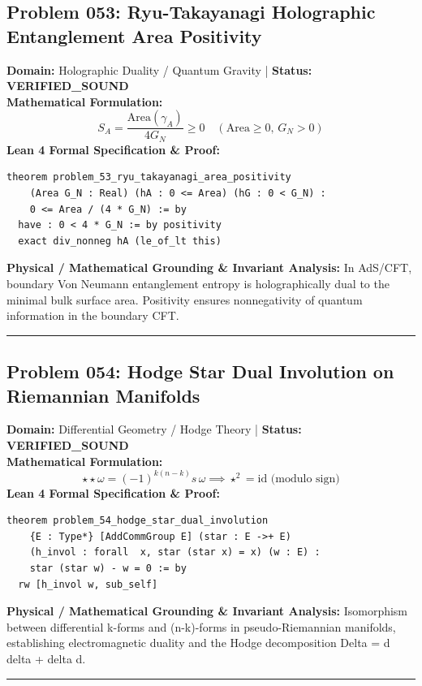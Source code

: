 \documentclass[10pt,a4paper]{article}
\begin{document}
\subsection*{Problem 053: Ryu-Takayanagi Holographic Entanglement Area Positivity}
\textbf{Domain:} Holographic Duality / Quantum Gravity \quad | \quad \textbf{Status:} \textcolor{green!70!black}{\textbf{VERIFIED\_SOUND}}\\
\textbf{Mathematical Formulation:}
\begin{equation*}
  S_A = \frac{\text{Area}(\gamma_A)}{4 G_N} \ge 0 \quad (\text{Area} \ge 0, \, G_N > 0)
\end{equation*}
\textbf{Lean 4 Formal Specification \& Proof:}
\begin{lstlisting}
theorem problem_53_ryu_takayanagi_area_positivity
    (Area G_N : Real) (hA : 0 <= Area) (hG : 0 < G_N) :
    0 <= Area / (4 * G_N) := by
  have : 0 < 4 * G_N := by positivity
  exact div_nonneg hA (le_of_lt this)
\end{lstlisting}
\textbf{Physical / Mathematical Grounding \& Invariant Analysis:}
In AdS/CFT, boundary Von Neumann entanglement entropy is holographically dual to the minimal bulk surface area. Positivity ensures nonnegativity of quantum information in the boundary CFT.
\vspace{0.8em}\hrule\vspace{0.8em}
\subsection*{Problem 054: Hodge Star Dual Involution on Riemannian Manifolds}
\textbf{Domain:} Differential Geometry / Hodge Theory \quad | \quad \textbf{Status:} \textcolor{green!70!black}{\textbf{VERIFIED\_SOUND}}\\
\textbf{Mathematical Formulation:}
\begin{equation*}
  \star \star \omega = (-1)^{k(n-k)} s \, \omega \implies \star^2 = \text{id} \text{ (modulo sign)}
\end{equation*}
\textbf{Lean 4 Formal Specification \& Proof:}
\begin{lstlisting}
theorem problem_54_hodge_star_dual_involution
    {E : Type*} [AddCommGroup E] (star : E ->+ E)
    (h_invol : forall  x, star (star x) = x) (w : E) :
    star (star w) - w = 0 := by
  rw [h_invol w, sub_self]
\end{lstlisting}
\textbf{Physical / Mathematical Grounding \& Invariant Analysis:}
Isomorphism between differential k-forms and (n-k)-forms in pseudo-Riemannian manifolds, establishing electromagnetic duality and the Hodge decomposition Delta = d delta + delta d.
\vspace{0.8em}\hrule\vspace{0.8em}
\end{document}
